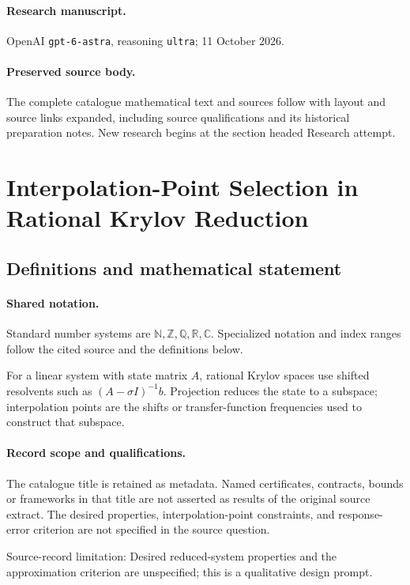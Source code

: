 \documentclass[11pt]{article}
\begin{document}
\paragraph{Research manuscript.} OpenAI \texttt{gpt-6-astra}, reasoning \texttt{ultra}; 11 October 2026.
\paragraph{Preserved source body.} The complete catalogue mathematical text and sources follow with layout and source links expanded, including source qualifications and its historical preparation notes. New research begins at the section headed Research attempt.

\section{Interpolation-Point Selection in Rational Krylov Reduction}\label{statement}

\subsection{Definitions and mathematical statement}

\paragraph{Shared notation.}Standard number systems are $\mathbb N,\mathbb Z,\mathbb Q,\mathbb R,\mathbb C$. Specialized notation and index ranges follow the cited source and the definitions below.


For a linear system with state matrix $A$, rational Krylov spaces use shifted resolvents such as $(A-\sigma I)^{-1}b$. Projection reduces the state to a subspace; interpolation points are the shifts or transfer-function frequencies used to construct that subspace.
\paragraph{Record scope and qualifications.}
The catalogue title is retained as metadata. Named certificates, contracts, bounds or frameworks in that title are not asserted as results of the original source extract.
The desired properties, interpolation-point constraints, and response-error criterion are not specified in the source question.

Source-record limitation: Desired reduced-system properties and the approximation criterion are unspecified; this is a qualitative design prompt.
\end{document}
